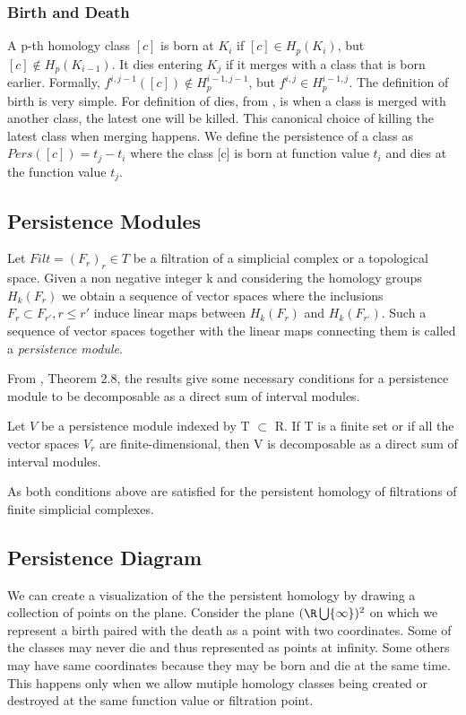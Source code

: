\subsubsection{Birth and Death}
A p-th homology class $[c]$ is born at $K_i$ if $[c] \in H_p(K_i)$, but $[c] \not\in H_p(K_{i-1})$. It dies entering $K_j$ if it merges with a class that is born earlier. Formally, $f^{i, j-1}([c]) \not\in H^{i-1, j-1}_p$, but $f^{i,j} \in H^{i-1, j}_p$. 
The definition of birth is very simple. 
For definition of dies, from \cite{comp_topology}, is when a class is merged with another class, the latest one will be killed. This canonical choice of killing the latest class when merging happens. We define the persistence of a class as $Pers([c]) = t_j - t_i$ where the class [c] is born at function value $t_i$ and dies at the function value $t_j$. 

\subsection{Persistence Modules}

\begin{definition} 
Let $Filt = (F_r)_r \in T$ be a filtration of a simplicial complex or a topological space. Given a non negative integer k and considering the homology groups $H_k(F_r)$ we obtain a sequence of vector spaces where the inclusions $F_r \subset F_{r'}, r \leq r'$ induce linear maps between $H_k(F_r)$ and $H_k(F_{r‘})$. Such a sequence of vector spaces together with the linear maps connecting them is called a \textit{persistence module}.
\end{definition}
From \cite{chazal2017introduction}, Theorem 2.8, the results give some necessary conditions for a persistence module to be decomposable as a direct sum of interval modules.
\begin{theorem}
Let $V$ be a persistence module indexed by T $\subset$ R. If T is a finite set or if all
the vector spaces $V_r$ are finite-dimensional, then V is decomposable as a direct sum of interval
modules.
\end{theorem}
As both conditions above are satisfied for the persistent homology of filtrations of finite
simplicial complexes. 

\subsection{Persistence Diagram}
We can create a visualization  of the the persistent homology by drawing a collection of points on the plane. Consider the plane $( \R \bigcup \{\infty\})^2$ on which we represent a birth paired with the death as a point with two coordinates. Some of the classes may never die and thus represented as points at infinity. Some others may have same coordinates because they may be born and die at the same time. This happens only when we allow mutiple homology classes being created or destroyed at the same function value or filtration point.

